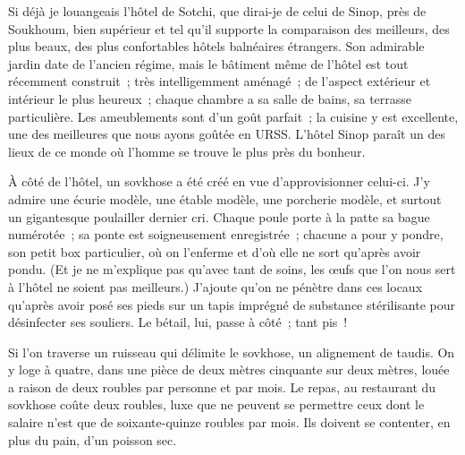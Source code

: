 \documentclass[twoside]{book} %
\newcommand{\astermono}{\medskip\centerline{\color{rubric}\large\selectfont{\syms ✻}}\medskip\par}%
\begin{document}
\astermono

\noindent Si déjà je louangeais l’hôtel de Sotchi, que dirai-je de celui de Sinop, près de Soukhoum, bien supérieur et tel qu’il supporte la comparaison des meilleurs, des plus beaux, des plus confortables hôtels balnéaires étrangers. Son admirable jardin date de l’ancien régime, mais le bâtiment même de l’hôtel est tout récemment construit ; très intelligemment aménagé ; de l’aspect extérieur et intérieur le plus heureux ; chaque chambre a sa salle de bains, sa terrasse particulière. Les ameublements sont d’un goût parfait ; la cuisine y est excellente, une des meilleures que nous ayons goûtée en URSS. L’hôtel Sinop paraît un des lieux de ce monde où l’homme se trouve le plus près du bonheur.\par
À côté de l’hôtel, un sovkhose a été créé en vue d’approvisionner celui-ci. J’y admire une écurie modèle, une étable modèle, une porcherie modèle, et surtout un gigantesque poulailler dernier cri. Chaque poule porte à la patte sa bague numérotée ; sa ponte est soigneusement enregistrée ; chacune a pour y pondre, son petit box particulier, où on l’enferme et d’où elle ne sort qu’après avoir pondu. (Et je ne m’explique pas qu’avec tant de soins, les œufs que l’on nous sert à l’hôtel ne soient pas meilleurs.) J’ajoute qu’on ne pénètre dans ces locaux qu’après avoir posé ses pieds sur un tapis imprégné de substance stérilisante pour désinfecter ses souliers. Le bétail, lui, passe à côté ; tant pis !\par
Si l’on traverse un ruisseau qui délimite le sovkhose, un alignement de taudis. On y loge à quatre, dans une pièce de deux mètres cinquante sur deux mètres, louée a raison de deux roubles par personne et par mois. Le repas, au restaurant du sovkhose coûte deux roubles, luxe que ne peuvent se permettre ceux dont le salaire n’est que de soixante-quinze roubles par mois. Ils doivent se contenter, en plus du pain, d’un poisson sec.\par

\astermono
\end{document}
